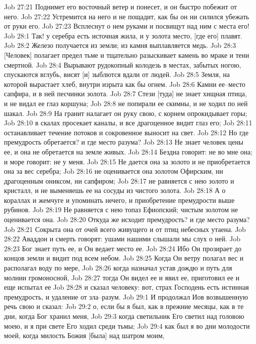 Job 27:21  Поднимет его восточный ветер и понесет, и он быстро побежит от него.
Job 27:22  Устремится на него и не пощадит, как бы он ни силился убежать от руки его.
Job 27:23  Всплеснут о нем руками и посвищут над ним с места его!
Job 28:1  Так! у серебра есть источная жила, и у золота место, [где его] плавят.
Job 28:2  Железо получается из земли; из камня выплавляется медь.
Job 28:3  [Человек] полагает предел тьме и тщательно разыскивает камень во мраке и тени смертной.
Job 28:4  Вырывают рудокопный колодезь в местах, забытых ногою, спускаются вглубь, висят [и] зыблются вдали от людей.
Job 28:5  Земля, на которой вырастает хлеб, внутри изрыта как бы огнем.
Job 28:6  Камни ее--место сапфира, и в ней песчинки золота.
Job 28:7  Стези [туда] не знает хищная птица, и не видал ее глаз коршуна;
Job 28:8  не попирали ее скимны, и не ходил по ней шакал.
Job 28:9  На гранит налагает он руку свою, с корнем опрокидывает горы;
Job 28:10  в скалах просекает каналы, и все драгоценное видит глаз его;
Job 28:11  останавливает течение потоков и сокровенное выносит на свет.
Job 28:12  Но где премудрость обретается? и где место разума?
Job 28:13  Не знает человек цены ее, и она не обретается на земле живых.
Job 28:14  Бездна говорит: не во мне она; и море говорит: не у меня.
Job 28:15  Не дается она за золото и не приобретается она за вес серебра;
Job 28:16  не оценивается она золотом Офирским, ни драгоценным ониксом, ни сапфиром;
Job 28:17  не равняется с нею золото и кристалл, и не выменяешь ее на сосуды из чистого золота.
Job 28:18  А о кораллах и жемчуге и упоминать нечего, и приобретение премудрости выше рубинов.
Job 28:19  Не равняется с нею топаз Ефиопский; чистым золотом не оценивается она.
Job 28:20  Откуда же исходит премудрость? и где место разума?
Job 28:21  Сокрыта она от очей всего живущего и от птиц небесных утаена.
Job 28:22  Аваддон и смерть говорят: ушами нашими слышали мы слух о ней.
Job 28:23  Бог знает путь ее, и Он ведает место ее.
Job 28:24  Ибо Он прозирает до концов земли и видит под всем небом.
Job 28:25  Когда Он ветру полагал вес и располагал воду по мере,
Job 28:26  когда назначал устав дождю и путь для молнии громоносной,
Job 28:27  тогда Он видел ее и явил ее, приготовил ее и еще испытал ее
Job 28:28  и сказал человеку: вот, страх Господень есть истинная премудрость, и удаление от зла--разум.
Job 29:1  И продолжал Иов возвышенную речь свою и сказал:
Job 29:2  о, если бы я был, как в прежние месяцы, как в те дни, когда Бог хранил меня,
Job 29:3  когда светильник Его светил над головою моею, и я при свете Его ходил среди тьмы;
Job 29:4  как был я во дни молодости моей, когда милость Божия [была] над шатром моим,

